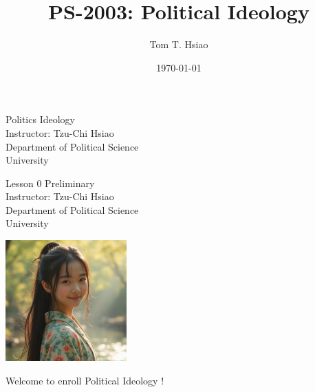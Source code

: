 \documentclass{beamer}
\title{PS-2003: Political Ideology}
\author{Tom T. Hsiao}
\date{\today}
\begin{document}
\begin{frame}
\begin{center}
\Large{Politics Ideology} \\
\vspace{3em}
\normalsize{Instructor: Tzu-Chi Hsiao} \\
\vspace{3em}
\small{Department of Political Science} \\
\vspace{1em}
\small{University}
\end{center}
\end{frame}
\begin{frame}
\begin{center}
\Large{Lesson 0 Preliminary} \\
\vspace{3em}
\normalsize{Instructor: Tzu-Chi Hsiao} \\
\vspace{3em}
\small{Department of Political Science} \\
\vspace{1em}
\small{University} \\
\end{center}
\end{frame}
\begin{frame}{}
\begin{center}
\includegraphics[width=0.35\textwidth]{instructor.png}
\end{center}
\vspace{1em}
\begin{center}
\large{Welcome to enroll Political Ideology !}
\end{center}
\end{frame}
\end{document}

